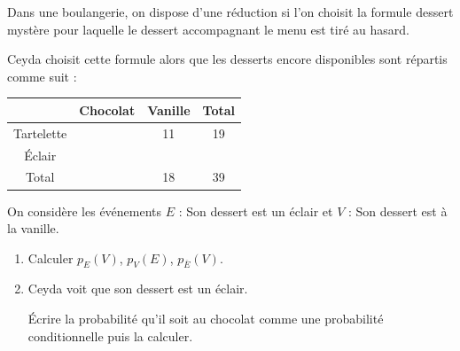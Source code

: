 \begin{exo}
	Dans une boulangerie, on dispose d'une réduction si l'on choisit la formule \og{} dessert mystère \fg{} pour laquelle le dessert accompagnant le menu est tiré au hasard.

	Ceyda choisit cette formule alors que les desserts encore disponibles sont répartis comme suit :

	\begin{center}
		\renewcommand{\arraystretch}{1.2}
		\begin{tabular}{|c|c|c|c|} \hline
			           & Chocolat     & Vanille     & Total        \\ \hline
			Tartelette & \phantom{8}  & 11          & 19           \\ \hline
			Éclair     & \phantom{13} & \phantom{7} & \phantom{20} \\ \hline
			Total      & \phantom{21} & 18          & 39           \\ \hline
		\end{tabular}
	\end{center}

	On considère les événements $E$ : \og{} Son dessert est un éclair \fg{} et $V$ : \og{} Son dessert est à la vanille. \fg{}

	\begin{enumerate}
		\item Calculer $p_{E}(V)$, $p_{V}(E)$, $p_{\overline{E}}(V)$.
		\item Ceyda voit que son dessert est un éclair.

		      Écrire la probabilité qu'il soit au chocolat comme une probabilité conditionnelle puis la calculer.
	\end{enumerate}
\end{exo}
